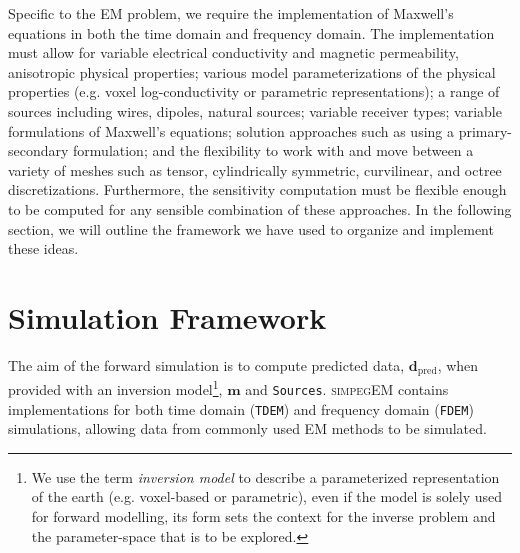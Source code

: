\documentclass[preprint,review,3p,times,onecolumn,authoryear]{elsarticle}
\newcommand{\simpegEM}{\textsc{simpegEM}\xspace}
\newcommand{\Sources}{\texttt{Sources}\xspace}
\newcommand{\TDEM}{\texttt{TDEM}\xspace}
\newcommand{\FDEM}{\texttt{FDEM}\xspace}
\newcommand{\dpred}{\mathbf{d}_\text{pred}}
\begin{document}
Specific to the EM problem, we require the implementation of Maxwell's
equations in both the time domain and frequency domain. The implementation
must allow for variable electrical conductivity and magnetic permeability,
anisotropic physical properties; various model parameterizations of the
physical properties (e.g. voxel  log-conductivity or parametric
representations); a range of sources including wires, dipoles, natural
sources; variable receiver types; variable formulations of Maxwell's
equations; solution approaches such as using a primary-secondary formulation; and the flexibility
to work with and move between a variety of meshes such as tensor,
cylindrically symmetric, curvilinear, and octree discretizations. Furthermore,
the sensitivity computation must be flexible enough to be computed for any
sensible combination of these approaches. In the following section, we will
outline the framework we have used to organize and implement these ideas.



\section{Simulation Framework}
\label{sec:Implementation}

The aim of the forward simulation is to compute predicted data, $\dpred$,
when provided with an inversion model\footnote{We use the term \emph{inversion model}
to describe a parameterized representation of the earth (e.g. voxel-based or
parametric), even if the model is solely used for forward modelling, its form
sets the context for the inverse problem and the parameter-space that is to be
explored.}, $\mathbf{m}$ and \Sources. \simpegEM contains implementations for
both time domain (\TDEM) and frequency domain (\FDEM) simulations, allowing
data from commonly used EM methods to be simulated.
\end{document}
